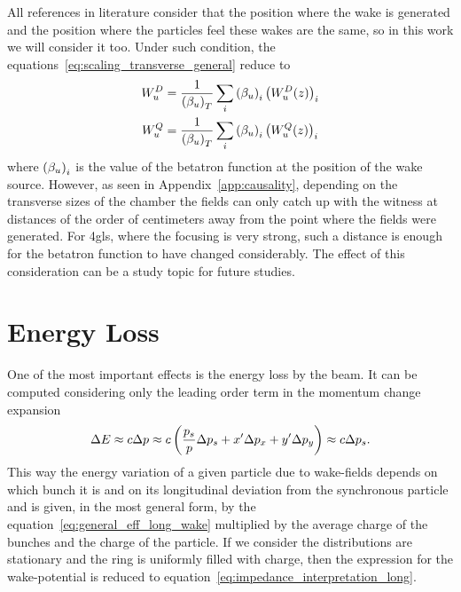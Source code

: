     All references in literature consider that the position where the wake is generated and the position where the particles feel these wakes are the same, so in this work we will consider it too. Under such condition, the equations~\eqref{eq:scaling_transverse_general} reduce to
    \begin{align}\label{eq:scaling_transverse_general}\nonumber
        W_u^D &=\frac{1}{\left(\beta_u\right)_T} \sum_i \left(\beta_u\right)_i\left(W_u^D(z)\right)_i \\
        W_u^Q &=\frac{1}{\left(\beta_u\right)_T} \sum_i \left(\beta_u\right)_i\left(W_u^Q(z)\right)_i
    \end{align}
    where $\left(\beta_u\right)_i$ is the value of the betatron function at the position of the wake source. However, as seen in Appendix~\ref{app:causality}, depending on the transverse sizes of the chamber the fields can only catch up with the witness at distances of the order of centimeters away from the point where the fields were generated. For \gls{4gls}, where the focusing is very strong, such a distance is enough for the betatron function to have changed considerably. The effect of this consideration can be a study topic for future studies.

\section{Energy Loss}

    One of the most important effects is the energy loss by the beam. It can be computed considering only the leading order term in the momentum change expansion
    \begin{align}
        \Delta E \approx c\Delta p \approx c\left(\frac{p_s}{p}\Delta p_s + x'\Delta p_x + y'\Delta p_y\right) \approx c\Delta p_s.
    \end{align}
    This way the energy variation of a given particle due to wake-fields depends on which bunch it is and on its longitudinal deviation from the synchronous particle and is given, in the most general form, by the  equation~\eqref{eq:general_eff_long_wake} multiplied by the average charge of the bunches and the charge of the particle. If we consider the distributions are stationary and the ring is uniformly filled with charge, then the expression for the wake-potential is reduced to equation~\eqref{eq:impedance_interpretation_long}.

